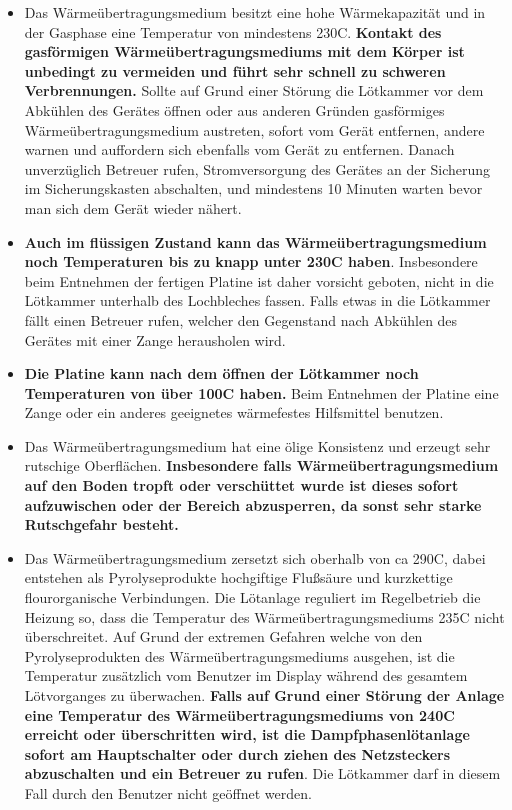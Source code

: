 \documentclass{\basedir/fablab-document}
\begin{document}
	\begin{itemize}
	\item Das W{\"a}rme{\"u}bertragungsmedium besitzt eine hohe W{\"a}rmekapazit{\"a}t und in der Gasphase eine Temperatur von mindestens 230\textdegree C. \textbf{Kontakt des gasf{\"o}rmigen W{\"a}rme{\"u}bertragungsmediums mit dem K{\"o}rper ist unbedingt zu vermeiden und f{\"u}hrt sehr schnell zu schweren Verbrennungen.} Sollte auf Grund einer St{\"o}rung die L{\"o}tkammer vor dem Abk{\"u}hlen des Ger{\"a}tes {\"o}ffnen oder aus anderen Gr{\"u}nden gasf{\"o}rmiges W{\"a}rme{\"u}bertragungsmedium austreten, sofort vom Ger{\"a}t entfernen, andere warnen und auffordern sich ebenfalls vom Ger{\"a}t zu entfernen. Danach unverz{\"u}glich Betreuer rufen, Stromversorgung des Ger{\"a}tes an der Sicherung im Sicherungskasten abschalten, und mindestens 10 Minuten warten bevor man sich dem Ger{\"a}t wieder n{\"a}hert.
	\item \textbf{Auch im fl{\"u}ssigen Zustand kann das W{\"a}rme{\"u}bertragungsmedium noch Temperaturen bis zu knapp unter 230\textdegree C haben}. Insbesondere beim Entnehmen der fertigen Platine ist daher vorsicht geboten, nicht in die L{\"o}tkammer unterhalb des Lochbleches fassen. Falls etwas in die L{\"o}tkammer f{\"a}llt einen Betreuer rufen, welcher den Gegenstand nach Abk{\"u}hlen des Ger{\"a}tes mit einer Zange herausholen wird.
	\item \textbf{Die Platine kann nach dem {\"o}ffnen der L{\"o}tkammer noch Temperaturen von {\"u}ber 100\textdegree C haben.} Beim Entnehmen der Platine eine Zange oder ein anderes geeignetes w{\"a}rmefestes Hilfsmittel benutzen.
	\item Das W{\"a}rme{\"u}bertragungsmedium hat eine {\"o}lige Konsistenz und erzeugt sehr rutschige Oberfl{\"a}chen. \textbf{Insbesondere falls W{\"a}rme{\"u}bertragungsmedium auf den Boden tropft oder versch{\"u}ttet wurde ist dieses sofort aufzuwischen oder der Bereich abzusperren, da sonst sehr starke Rutschgefahr besteht.}
	\item Das W{\"a}rme{\"u}bertragungsmedium zersetzt sich oberhalb von ca 290\textdegree C, dabei entstehen als Pyrolyseprodukte hochgiftige Flu{\ss}s{\"a}ure und kurzkettige flourorganische Verbindungen. Die L{\"o}tanlage reguliert im Regelbetrieb die Heizung so, dass die Temperatur des W{\"a}rme{\"u}bertragungsmediums 235C nicht {\"u}berschreitet. Auf Grund der extremen Gefahren welche von den Pyrolyseprodukten des W{\"a}rme{\"u}bertragungsmediums ausgehen, ist die Temperatur zus{\"a}tzlich vom Benutzer im Display w{\"a}hrend des gesamtem L{\"o}tvorganges zu {\"u}berwachen. \textbf{Falls auf Grund einer Störung der Anlage eine Temperatur des W{\"a}rme{\"u}bertragungsmediums von 240\textdegree C erreicht oder {\"u}berschritten wird, ist die Dampfphasenl{\"o}tanlage sofort am Hauptschalter oder durch ziehen des Netzsteckers abzuschalten und ein Betreuer zu rufen}. Die L{\"o}tkammer darf in diesem Fall durch den Benutzer nicht ge{\"o}ffnet werden.

\end{itemize}
\end{document}
